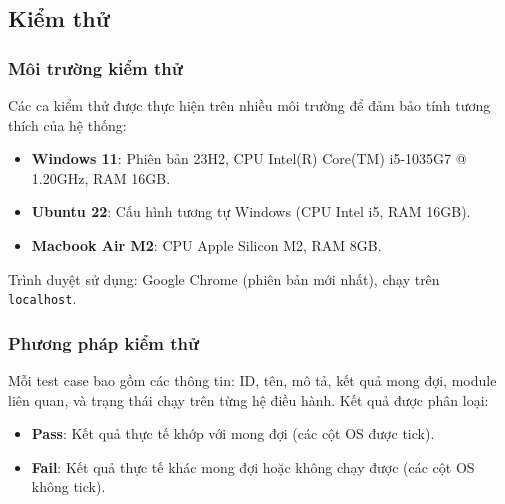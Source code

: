 \subsection{Kiểm thử}

\subsubsection{Môi trường kiểm thử}
Các ca kiểm thử được thực hiện trên nhiều môi trường để đảm bảo tính tương thích của hệ thống:  
\begin{itemize}
	\item \textbf{Windows 11}: Phiên bản 23H2, CPU Intel(R) Core(TM) i5-1035G7 @ 1.20GHz, RAM 16GB.  
	\item \textbf{Ubuntu 22}: Cấu hình tương tự Windows (CPU Intel i5, RAM 16GB).  
	\item \textbf{Macbook Air M2}: CPU Apple Silicon M2, RAM 8GB.  
\end{itemize}
Trình duyệt sử dụng: Google Chrome (phiên bản mới nhất), chạy trên \texttt{localhost}.

\subsubsection{Phương pháp kiểm thử}
Mỗi test case bao gồm các thông tin: ID, tên, mô tả, kết quả mong đợi, module liên quan, và trạng thái chạy trên từng hệ điều hành.  
Kết quả được phân loại:  
\begin{itemize}
	\item \textbf{Pass}: Kết quả thực tế khớp với mong đợi (các cột OS được tick).  
	\item \textbf{Fail}: Kết quả thực tế khác mong đợi hoặc không chạy được (các cột OS không tick).  
\end{itemize}

